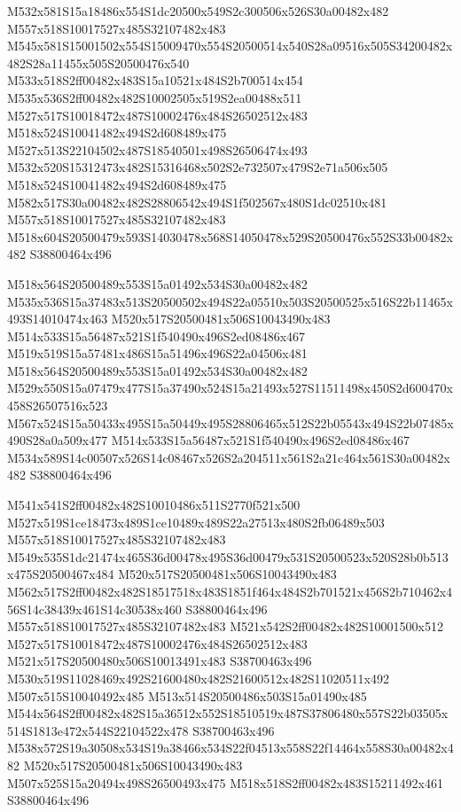 \documentclass{article}
\begin{document}
\begin{multicols}{2}
M532x581S15a18486x554S1dc20500x549S2c300506x526S30a00482x482 M557x518S10017527x485S32107482x483 M545x581S15001502x554S15009470x554S20500514x540S28a09516x505S34200482x482S28a11455x505S20500476x540 M533x518S2ff00482x483S15a10521x484S2b700514x454 M535x536S2ff00482x482S10002505x519S2ea00488x511 M527x517S10018472x487S10002476x484S26502512x483 M518x524S10041482x494S2d608489x475 M527x513S22104502x487S18540501x498S26506474x493 M532x520S15312473x482S15316468x502S2e732507x479S2e71a506x505 M518x524S10041482x494S2d608489x475 M582x517S30a00482x482S28806542x494S1f502567x480S1dc02510x481 M557x518S10017527x485S32107482x483 M518x604S20500479x593S14030478x568S14050478x529S20500476x552S33b00482x482 S38800464x496

M518x564S20500489x553S15a01492x534S30a00482x482 M535x536S15a37483x513S20500502x494S22a05510x503S20500525x516S22b11465x493S14010474x463 M520x517S20500481x506S10043490x483 M514x533S15a56487x521S1f540490x496S2ed08486x467 M519x519S15a57481x486S15a51496x496S22a04506x481 M518x564S20500489x553S15a01492x534S30a00482x482 M529x550S15a07479x477S15a37490x524S15a21493x527S11511498x450S2d600470x458S26507516x523 M567x524S15a50433x495S15a50449x495S28806465x512S22b05543x494S22b07485x490S28a0a509x477 M514x533S15a56487x521S1f540490x496S2ed08486x467 M534x589S14c00507x526S14c08467x526S2a204511x561S2a21c464x561S30a00482x482 S38800464x496

M541x541S2ff00482x482S10010486x511S2770f521x500 M527x519S1ce18473x489S1ce10489x489S22a27513x480S2fb06489x503 M557x518S10017527x485S32107482x483 M549x535S1dc21474x465S36d00478x495S36d00479x531S20500523x520S28b0b513x475S20500467x484 M520x517S20500481x506S10043490x483 M562x517S2ff00482x482S18517518x483S1851f464x484S2b701521x456S2b710462x456S14c38439x461S14c30538x460 S38800464x496 M557x518S10017527x485S32107482x483 M521x542S2ff00482x482S10001500x512 M527x517S10018472x487S10002476x484S26502512x483 M521x517S20500480x506S10013491x483 S38700463x496 M530x519S11028469x492S21600480x482S21600512x482S11020511x492 M507x515S10040492x485 M513x514S20500486x503S15a01490x485 M544x564S2ff00482x482S15a36512x552S18510519x487S37806480x557S22b03505x514S1813e472x544S22104522x478 S38700463x496 M538x572S19a30508x534S19a38466x534S22f04513x558S22f14464x558S30a00482x482 M520x517S20500481x506S10043490x483 M507x525S15a20494x498S26500493x475 M518x518S2ff00482x483S15211492x461 S38800464x496


\end{multicols}
\end{document}
